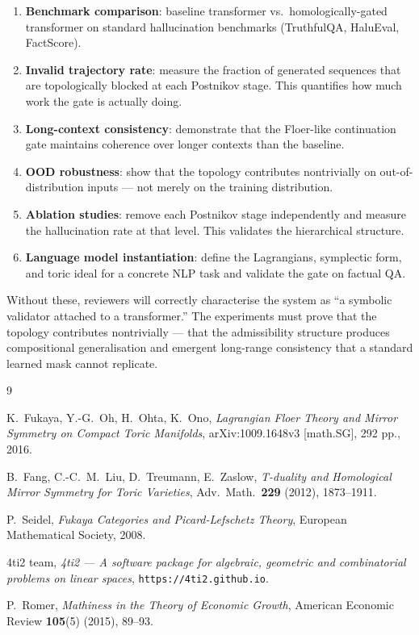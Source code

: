\documentclass[11pt,a4paper]{article}
\begin{document}
\begin{enumerate}[label=(\roman*)]
  \item \textbf{Benchmark comparison}: baseline transformer vs.\
        homologically-gated transformer on standard hallucination
        benchmarks (TruthfulQA, HaluEval, FactScore).
  \item \textbf{Invalid trajectory rate}: measure the fraction of
        generated sequences that are topologically blocked at each
        Postnikov stage. This quantifies how much work the gate
        is actually doing.
  \item \textbf{Long-context consistency}: demonstrate that the
        Floer-like continuation gate maintains coherence over
        longer contexts than the baseline.
  \item \textbf{OOD robustness}: show that the topology
        contributes nontrivially on out-of-distribution inputs
        --- not merely on the training distribution.
  \item \textbf{Ablation studies}: remove each Postnikov stage
        independently and measure the hallucination rate at that
        level. This validates the hierarchical structure.
  \item \textbf{Language model instantiation}: define the
        Lagrangians, symplectic form, and toric ideal for a
        concrete NLP task and validate the gate on factual QA.
\end{enumerate}

\noindent
Without these, reviewers will correctly characterise the system as
``a symbolic validator attached to a transformer.''
The experiments must prove that the topology contributes
nontrivially --- that the admissibility structure produces
compositional generalisation and emergent long-range consistency
that a standard learned mask cannot replicate.

\begin{thebibliography}{9}

  K.~Fukaya, Y.-G.~Oh, H.~Ohta, K.~Ono,
  \emph{Lagrangian Floer Theory and Mirror Symmetry on Compact
  Toric Manifolds},
  arXiv:1009.1648v3 [math.SG], 292 pp., 2016.

  B.~Fang, C.-C.~M.~Liu, D.~Treumann, E.~Zaslow,
  \emph{T-duality and Homological Mirror Symmetry for Toric Varieties},
  Adv.\ Math.\ \textbf{229} (2012), 1873--1911.

  P.~Seidel,
  \emph{Fukaya Categories and Picard-Lefschetz Theory},
  European Mathematical Society, 2008.

  4ti2 team,
  \emph{4ti2 --- A software package for algebraic, geometric and
  combinatorial problems on linear spaces},
  \texttt{https://4ti2.github.io}.

  P.~Romer,
  \emph{Mathiness in the Theory of Economic Growth},
  American Economic Review \textbf{105}(5) (2015), 89--93.

\end{thebibliography}
\end{document}
